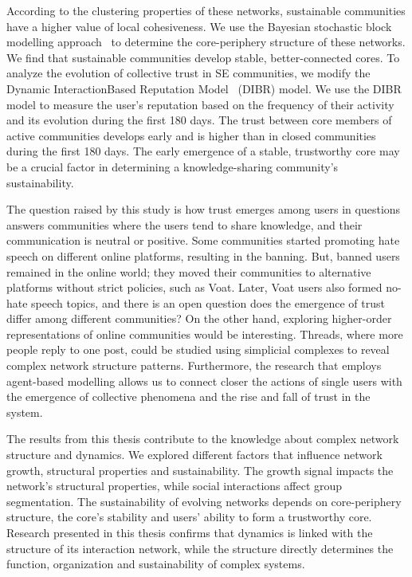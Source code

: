 According to the clustering properties of these networks, sustainable communities have a higher value of local cohesiveness. We use the Bayesian stochastic block modelling approach~\cite{gallagher2020clarified} to determine the core-periphery structure of these networks. We find that sustainable communities develop stable, better-connected cores. To analyze the evolution of collective trust in SE communities, we modify the Dynamic InteractionBased Reputation Model~\cite{melnikov2018toward} (DIBR) model. We use the DIBR model to measure the user's reputation based on the frequency of their activity and its evolution during the first 180 days. The trust between core members of active communities develops early and is higher than in closed communities during the first 180 days. The early emergence of a stable, trustworthy core may be a crucial factor in determining a knowledge-sharing community's sustainability. 

The question raised by this study is how trust emerges among users in questions answers communities where the users tend to share knowledge, and their communication is neutral or positive. Some communities started promoting hate speech on different online platforms, resulting in the banning. But, banned users remained in the online world; they moved their communities to alternative platforms without strict policies, such as Voat. Later, Voat users also formed no-hate speech topics, and there is an open question does the emergence of trust differ among different communities? On the other hand, exploring higher-order representations of online communities would be interesting. Threads, where more people reply to one post, could be studied using simplicial complexes to reveal complex network structure patterns. Furthermore, the research that employs agent-based modelling allows us to connect closer the actions of single users with the emergence of collective phenomena and the rise and fall of trust in the system. 

The results from this thesis contribute to the knowledge about complex network structure and dynamics. We explored different factors that influence network growth, structural properties and sustainability. The growth signal impacts the network's structural properties, while social interactions affect group segmentation. The sustainability of evolving networks depends on core-periphery structure, the core's stability and users' ability to form a trustworthy core. Research presented in this thesis confirms that dynamics is linked with the structure of its interaction network, while the structure directly determines the function, organization and sustainability of complex systems.  

